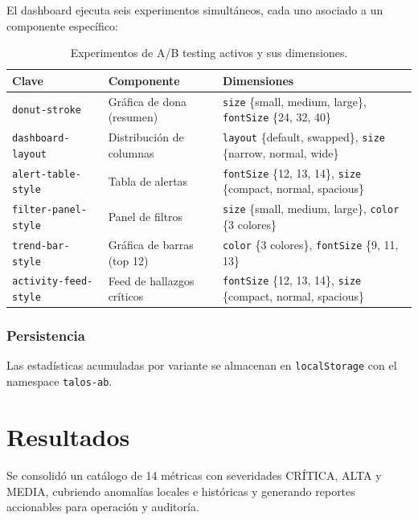 \documentclass[11pt]{article}
\begin{document}
El dashboard ejecuta seis experimentos simultáneos, cada uno asociado a un componente específico:

\begin{table}[H]
\centering
\begin{tabular}{@{}lll@{}}
\toprule
\textbf{Clave} & \textbf{Componente} & \textbf{Dimensiones} \\
\midrule
\texttt{donut-stroke}       & Gráfica de dona (resumen) & \texttt{size} \{small, medium, large\}, \texttt{fontSize} \{24, 32, 40\} \\
\texttt{dashboard-layout}   & Distribución de columnas  & \texttt{layout} \{default, swapped\}, \texttt{size} \{narrow, normal, wide\} \\
\texttt{alert-table-style}  & Tabla de alertas          & \texttt{fontSize} \{12, 13, 14\}, \texttt{size} \{compact, normal, spacious\} \\
\texttt{filter-panel-style} & Panel de filtros          & \texttt{size} \{small, medium, large\}, \texttt{color} \{3 colores\} \\
\texttt{trend-bar-style}    & Gráfica de barras (top 12)& \texttt{color} \{3 colores\}, \texttt{fontSize} \{9, 11, 13\} \\
\texttt{activity-feed-style}& Feed de hallazgos críticos& \texttt{fontSize} \{12, 13, 14\}, \texttt{size} \{compact, normal, spacious\} \\
\bottomrule
\end{tabular}
\caption{Experimentos de A/B testing activos y sus dimensiones.}
\end{table}

\subsubsection*{Persistencia}

Las estadísticas acumuladas por variante se almacenan en \texttt{localStorage} con el namespace \texttt{talos-ab}.

\section*{Resultados}
Se consolidó un catálogo de 14 métricas con severidades CRÍTICA, ALTA y MEDIA, cubriendo anomalías locales e históricas y generando reportes accionables para operación y auditoría.
\end{document}
